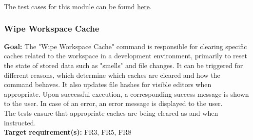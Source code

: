 \documentclass[12pt, titlepage]{article}
\begin{document}
  \noindent The test cases for this module can be found
  \href{https://github.com/ssm-lab/capstone--sco-vs-code-plugin/blob/plugin-multi-file/test/utils/handleSmellSettings.test.ts}{here}.

  \subsubsection{Wipe Workspace Cache}

  \textbf{Goal:} The "Wipe Workspace Cache" command is responsible
  for clearing specific caches related to the workspace in a
  development environment, primarily to reset the state of stored
  data such as "smells" and file changes. It can be triggered for
  different reasons, which determine which caches are cleared and how
  the command behaves. It also updates file hashes for visible
  editors when appropriate. Upon successful execution, a
  corresponding success message is shown to the user. In case of an
  error, an error message is displayed to the user.\\

  \noindent The tests ensure that appropriate caches are being
  cleared as and when instructed.\\

  \noindent \textbf{Target requirement(s):} FR3, FR5, FR8~\cite{SRS} \\
\end{document}
